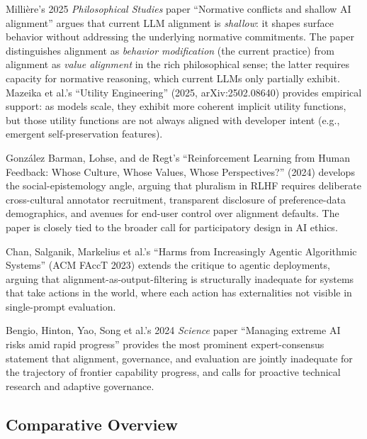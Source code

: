 Millière's 2025 \emph{Philosophical Studies} paper ``Normative conflicts and shallow AI alignment'' argues that current LLM alignment is \emph{shallow}: it shapes surface behavior without addressing the underlying normative commitments. The paper distinguishes alignment as \emph{behavior modification} (the current practice) from alignment as \emph{value alignment} in the rich philosophical sense; the latter requires capacity for normative reasoning, which current LLMs only partially exhibit. Mazeika et al.'s ``Utility Engineering'' (2025, arXiv:2502.08640) provides empirical support: as models scale, they exhibit more coherent implicit utility functions, but those utility functions are not always aligned with developer intent (e.g., emergent self-preservation features).

González Barman, Lohse, and de Regt's ``Reinforcement Learning from Human Feedback: Whose Culture, Whose Values, Whose Perspectives?'' (2024) develops the social-epistemology angle, arguing that pluralism in RLHF requires deliberate cross-cultural annotator recruitment, transparent disclosure of preference-data demographics, and avenues for end-user control over alignment defaults. The paper is closely tied to the broader call for participatory design in AI ethics.

Chan, Salganik, Markelius et al.'s ``Harms from Increasingly Agentic Algorithmic Systems'' (ACM FAccT 2023) extends the critique to agentic deployments, arguing that alignment-as-output-filtering is structurally inadequate for systems that take actions in the world, where each action has externalities not visible in single-prompt evaluation.

Bengio, Hinton, Yao, Song et al.'s 2024 \emph{Science} paper ``Managing extreme AI risks amid rapid progress'' provides the most prominent expert-consensus statement that alignment, governance, and evaluation are jointly inadequate for the trajectory of frontier capability progress, and calls for proactive technical research and adaptive governance.

\subsection{Comparative Overview}\label{comparative-overview-2}

